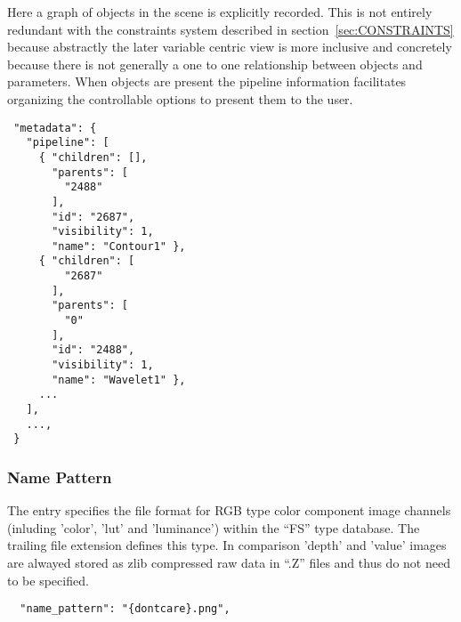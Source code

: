 Here a graph of objects in the scene is explicitly recorded. This is not entirely redundant with the constraints system described in section~\ref{sec:CONSTRAINTS} because abstractly the later variable centric view is more inclusive and concretely because there is not generally a one to one relationship between objects and parameters. When objects are present the pipeline information facilitates organizing the controllable options to present them to the user.

\begin{verbatim}
 "metadata": {
   "pipeline": [
     { "children": [],
       "parents": [
         "2488"
       ],
       "id": "2687",
       "visibility": 1,
       "name": "Contour1" },
     { "children": [
         "2687"
       ],
       "parents": [
         "0"
       ],
       "id": "2488",
       "visibility": 1,
       "name": "Wavelet1" },
     ...
   ],
   ...,
 }
\end{verbatim}

\subsubsection{Name Pattern}
\label{sec:namepattern}

The \namepattern entry specifies the file format for RGB type color
component image channels (inluding 'color', 'lut' and 'luminance')
within the ``FS'' type database. The trailing file extension defines
this type. In comparison 'depth' and 'value' images are alwayed stored as zlib compressed
raw data in ``.Z'' files and thus do not need to be specified.

\begin{verbatim}
  "name_pattern": "{dontcare}.png",
\end{verbatim}
